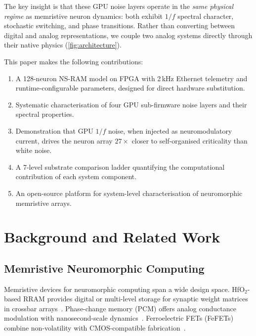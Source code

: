 \documentclass[11pt]{article}
\begin{document}
The key insight is that these GPU noise layers operate in the
\emph{same physical regime} as memristive neuron dynamics: both
exhibit $1/f$ spectral character, stochastic switching, and
phase transitions.  Rather than converting between digital and
analog representations, we couple two analog systems directly
through their native physics (\cref{fig:architecture}).

This paper makes the following contributions:

\begin{enumerate}[leftmargin=1.5em, itemsep=2pt]
  \item A 128-neuron NS-RAM model on FPGA with 2\,kHz Ethernet
    telemetry and runtime-configurable parameters, designed for
    direct hardware substitution.
  \item Systematic characterisation of four GPU sub-firmware noise
    layers and their spectral properties.
  \item Demonstration that GPU $1/f$ noise, when injected as
    neuromodulatory current, drives the neuron array $27\times$
    closer to self-organised criticality than white noise.
  \item A 7-level substrate comparison ladder quantifying the
    computational contribution of each system component.
  \item An open-source platform for system-level characterisation
    of neuromorphic memristive arrays.
\end{enumerate}


\section{Background and Related Work}
\label{sec:related}

\subsection{Memristive Neuromorphic Computing}

Memristive devices for neuromorphic computing span a wide
design space.  HfO$_2$-based RRAM provides digital or
multi-level storage for synaptic weight matrices in crossbar
arrays~\cite{ielmini2018, prezioso2015}.  Phase-change memory
(PCM) offers analog conductance modulation with
nanosecond-scale dynamics~\cite{tuma2016, wright2022}.
Ferroelectric FETs (FeFETs) combine non-volatility with
CMOS-compatible fabrication~\cite{jerry2018}.
\end{document}
